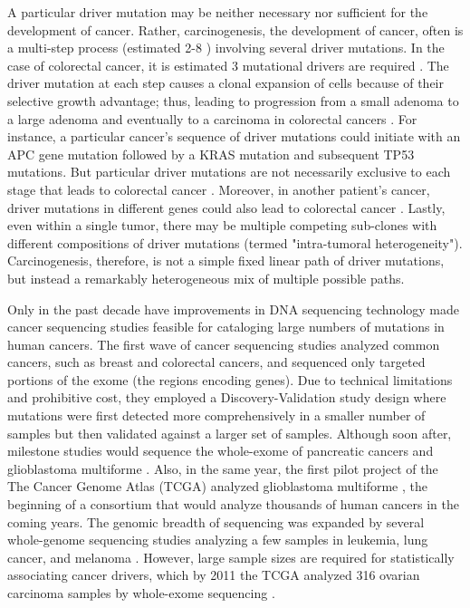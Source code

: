 A particular driver mutation may be neither necessary nor sufficient for the development of cancer. Rather, carcinogenesis, the development of cancer, often is a multi-step process (estimated 2-8 \cite{RN25}) involving several driver mutations. In the case of colorectal cancer, it is estimated 3 mutational drivers are required \cite{RN27}. The driver mutation at each step causes a clonal expansion of cells because of their selective growth advantage; thus, leading to progression from a small adenoma to a large adenoma and eventually to a carcinoma in colorectal cancers \cite{RN26}. For instance, a particular cancer's sequence of driver mutations could initiate with an APC gene mutation followed by a KRAS mutation and subsequent TP53 mutations. But particular driver mutations are not necessarily exclusive to each stage that leads to colorectal cancer \cite{RN26}. Moreover, in another patient's cancer, driver mutations in different genes could also lead to colorectal cancer \cite{RN48}. Lastly, even within a single tumor, there may be multiple competing sub-clones with different compositions of driver mutations (termed "intra-tumoral heterogeneity").  Carcinogenesis, therefore, is not a simple fixed linear path of driver mutations, but instead a remarkably heterogeneous mix of multiple possible paths. 

Only in the past decade have improvements in DNA sequencing technology made cancer sequencing studies feasible for cataloging large numbers of mutations in human cancers. The first wave of cancer sequencing studies \cite{RN2, RN4, RN3} analyzed common cancers, such as breast and colorectal cancers, and sequenced only targeted portions of the exome (the regions encoding genes). Due to technical limitations and prohibitive cost, they employed a Discovery-Validation study design where mutations were first detected more comprehensively in a smaller number of samples but then validated against a larger set of samples. Although soon after, milestone studies would sequence the whole-exome of pancreatic cancers \cite{RN5} and glioblastoma multiforme \cite{RN6}.  Also, in the same year, the first pilot project of the The Cancer Genome Atlas (TCGA) analyzed glioblastoma multiforme \cite{RN7}, the beginning of a consortium that would analyze thousands of human cancers in the coming years. The genomic breadth of sequencing was expanded by several whole-genome sequencing studies analyzing a few samples in leukemia, lung cancer, and melanoma \cite{RN8, RN9, RN10}. However, large sample sizes are required for statistically associating cancer drivers, which by 2011 the TCGA analyzed 316 ovarian carcinoma samples by whole-exome sequencing \cite{RN11}.

